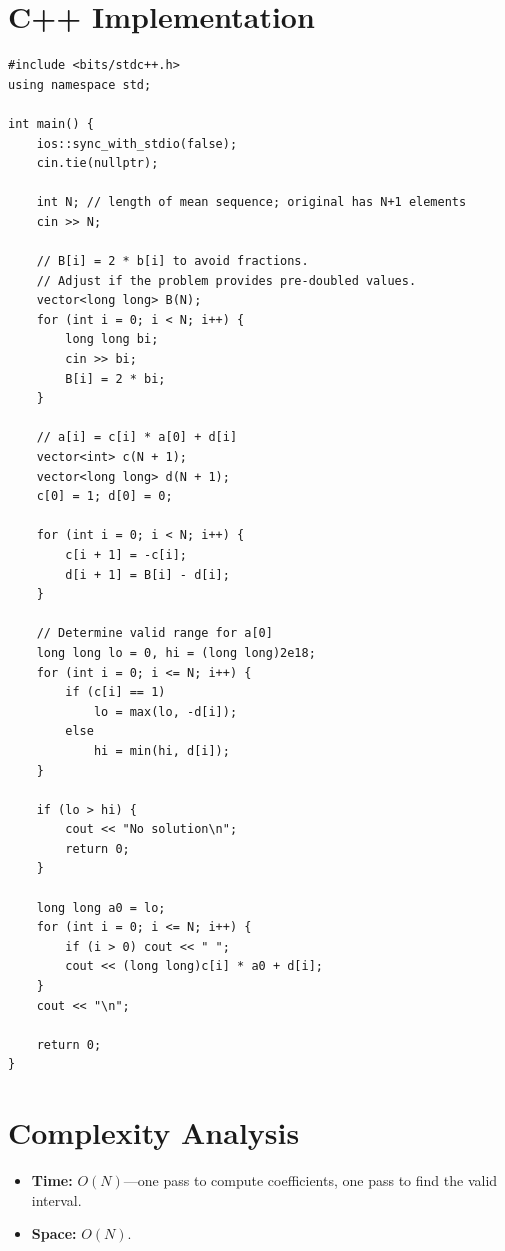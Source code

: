 \documentclass[11pt,a4paper]{article}
\begin{document}
\section{C++ Implementation}

\begin{lstlisting}
#include <bits/stdc++.h>
using namespace std;

int main() {
    ios::sync_with_stdio(false);
    cin.tie(nullptr);

    int N; // length of mean sequence; original has N+1 elements
    cin >> N;

    // B[i] = 2 * b[i] to avoid fractions.
    // Adjust if the problem provides pre-doubled values.
    vector<long long> B(N);
    for (int i = 0; i < N; i++) {
        long long bi;
        cin >> bi;
        B[i] = 2 * bi;
    }

    // a[i] = c[i] * a[0] + d[i]
    vector<int> c(N + 1);
    vector<long long> d(N + 1);
    c[0] = 1; d[0] = 0;

    for (int i = 0; i < N; i++) {
        c[i + 1] = -c[i];
        d[i + 1] = B[i] - d[i];
    }

    // Determine valid range for a[0]
    long long lo = 0, hi = (long long)2e18;
    for (int i = 0; i <= N; i++) {
        if (c[i] == 1)
            lo = max(lo, -d[i]);
        else
            hi = min(hi, d[i]);
    }

    if (lo > hi) {
        cout << "No solution\n";
        return 0;
    }

    long long a0 = lo;
    for (int i = 0; i <= N; i++) {
        if (i > 0) cout << " ";
        cout << (long long)c[i] * a0 + d[i];
    }
    cout << "\n";

    return 0;
}
\end{lstlisting}

\section{Complexity Analysis}
\begin{itemize}
  \item \textbf{Time:} $O(N)$---one pass to compute coefficients, one
        pass to find the valid interval.
  \item \textbf{Space:} $O(N)$.
\end{itemize}
\end{document}
